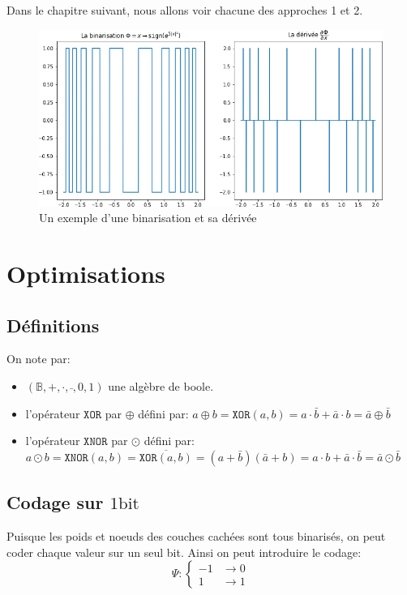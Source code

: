 Dans le chapitre suivant, nous allons voir chacune des approches 1 et 2.
\begin{figure}[htp!]
	\centering
	\includegraphics[width=.75\textwidth]{Figures/binarisation-plot.png}
	\caption{Un exemple d'une binarisation et sa dérivée}
	\label{fig:Binarisation-Example}
\end{figure}
\FloatBarrier
\newpage
\section{Optimisations}
\subsection{Définitions}
On note par:

\begin{itemize}
\item $(\mathbb{B},+,\cdot,\bar{},0,1 )$ une algèbre de boole.
\item l'opérateur $\mathtt{XOR}$ par $\oplus$ défini par:
\newline $a\oplus b = \mathtt{XOR}(a,b)=a\cdot \bar{b}+\bar{a}\cdot b=\bar{a}\oplus \bar{b}$
\item l'opérateur $\mathtt{XNOR}$ par $\odot$ défini par:
\newline $a\odot b = \mathtt{XNOR}(a,b)=\overbar{\mathtt{XOR}(a,b)}= (a + \bar{b}) (\bar{a}+b) = a\cdot b + \bar{a} \cdot \bar{b}=\bar{a}\odot \bar{b}$
\end{itemize}

\subsection{Codage sur $1\text{bit}$}
Puisque les poids et noeuds des couches cachées sont tous binarisés, on peut coder chaque valeur sur un seul bit. Ainsi on peut introduire le codage: 
$$\Psi: \begin{cases}
	-1 & \rightarrow 0 \\
	1 & \rightarrow 1
\end{cases}$$

